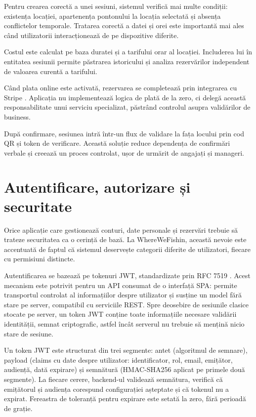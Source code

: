 Pentru crearea corectă a unei sesiuni, sistemul verifică mai multe condiții: existența locației, apartenența pontonului la locația selectată și absența conflictelor temporale. Tratarea corectă a datei și orei este importantă mai ales când utilizatorii interacționează de pe dispozitive diferite.

Costul este calculat pe baza duratei și a tarifului orar al locației. Includerea lui în entitatea sesiunii permite păstrarea istoricului și analiza rezervărilor independent de valoarea curentă a tarifului.

Când plata online este activată, rezervarea se completează prin integrarea cu Stripe \citep{stripe}. Aplicația nu implementează logica de plată de la zero, ci delegă această responsabilitate unui serviciu specializat, păstrând controlul asupra validărilor de business.

După confirmare, sesiunea intră într-un flux de validare la fața locului prin cod QR și token de verificare. Această soluție reduce dependența de confirmări verbale și creează un proces controlat, ușor de urmărit de angajați și manageri.

\section{Autentificare, autorizare și securitate}

Orice aplicație care gestionează conturi, date personale și rezervări trebuie să trateze securitatea ca o cerință de bază. La WhereWeFishin, această nevoie este accentuată de faptul că sistemul deservește categorii diferite de utilizatori, fiecare cu permisiuni distincte.

Autentificarea se bazează pe tokenuri JWT, standardizate prin RFC 7519 \citep{jwt}. Acest mecanism este potrivit pentru un API consumat de o interfață SPA: permite transportul controlat al informațiilor despre utilizator și susține un model fără stare pe server, compatibil cu serviciile REST. Spre deosebire de sesiunile clasice stocate pe server, un token JWT conține toate informațiile necesare validării identității, semnat criptografic, astfel încât serverul nu trebuie să mențină nicio stare de sesiune.

Un token JWT este structurat din trei segmente: antet (algoritmul de semnare), payload (claims cu date despre utilizator: identificator, rol, email, emițător, audiență, dată expirare) și semnătură (HMAC-SHA256 \citep{hmac-rfc2104} aplicat pe primele două segmente). La fiecare cerere, backend-ul validează semnătura, verifică că emițătorul și audiența corespund configurației așteptate și că tokenul nu a expirat. Fereastra de toleranță pentru expirare este setată la zero, fără perioadă de grație.


